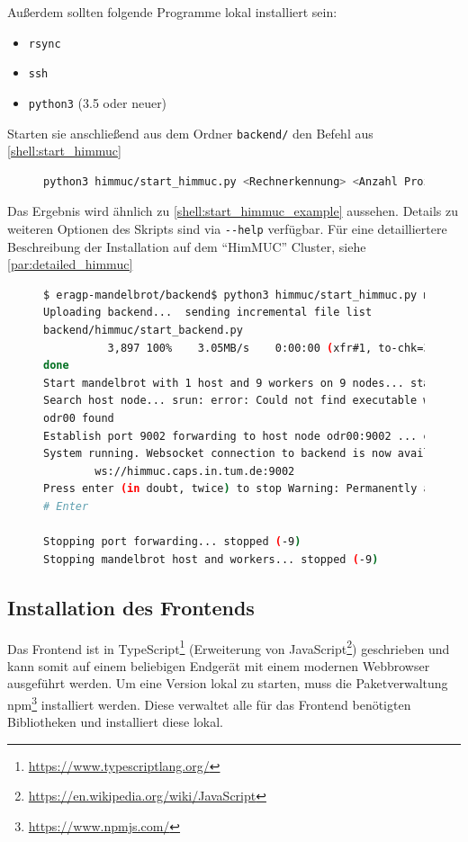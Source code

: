 Außerdem sollten folgende Programme lokal installiert sein:
\begin{itemize}
	\item \verb|rsync|
	\item \verb|ssh|
	\item \verb|python3| (3.5 oder neuer)
\end{itemize}

Starten sie anschließend aus dem Ordner \verb|backend/| den Befehl aus \autoref{shell:start_himmuc}

\begin{figure}[h!]
	\begin{lstlisting}[language=bash, caption={Start der Entwicklungsumbegung auf dem HimMUC}, label={shell:start_himmuc}]
python3 himmuc/start_himmuc.py <Rechnerkennung> <Anzahl Prozesse> <Anzahl Rechenknoten> 
    \end{lstlisting}
\end{figure}

Das Ergebnis wird ähnlich zu \autoref{shell:start_himmuc_example} aussehen.
Details zu weiteren Optionen des Skripts sind via \verb|--help| verfügbar.
Für eine detailliertere Beschreibung der Installation auf dem \enquote{HimMUC} Cluster,
siehe \autoref{par:detailed_himmuc}

\begin{figure}
	\begin{lstlisting}[language=bash, caption={Beispielausgabe bei Start der Entwicklungsumbegung auf dem HimMUC}, label={shell:start_himmuc_example}]
$ eragp-mandelbrot/backend$ python3 himmuc/start_himmuc.py muendler 10 9
Uploading backend...  sending incremental file list
backend/himmuc/start_backend.py
          3,897 100%    3.05MB/s    0:00:00 (xfr#1, to-chk=35/62)
done
Start mandelbrot with 1 host and 9 workers on 9 nodes... started mandelbrot
Search host node... srun: error: Could not find executable worker
odr00 found
Establish port 9002 forwarding to host node odr00:9002 ... established
System running. Websocket connection to backend is now available at
        ws://himmuc.caps.in.tum.de:9002
Press enter (in doubt, twice) to stop Warning: Permanently added the ED25519 host key for IP address '10.42.0.54' to the list of known hosts.
# Enter

Stopping port forwarding... stopped (-9)
Stopping mandelbrot host and workers... stopped (-9)
    \end{lstlisting}
\end{figure}

\subsection{Installation des Frontends}
Das Frontend ist in TypeScript\footnote{\url{https://www.typescriptlang.org/}} (Erweiterung von JavaScript\footnote{\url{https://en.wikipedia.org/wiki/JavaScript}})
geschrieben und kann somit auf einem beliebigen Endgerät mit einem modernen Webbrowser ausgeführt werden.
Um eine Version lokal zu starten, muss die Paketverwaltung npm\footnote{\url{https://www.npmjs.com/}} installiert werden. Diese verwaltet alle
für das Frontend benötigten Bibliotheken und installiert diese lokal.

